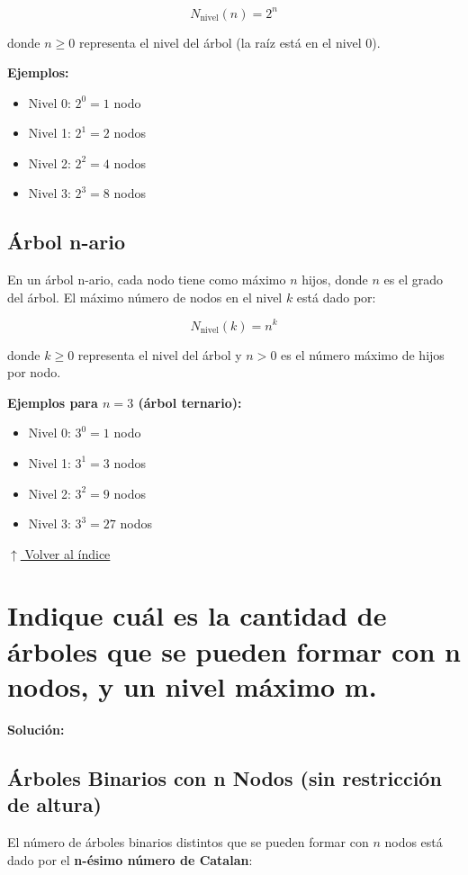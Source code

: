 \documentclass[12pt]{article}
\newcommand{\solucion}{%
    \vspace{0.8em}%
    \textbf{Solución:}%
}
\newcommand{\volverindice}{%
    \vspace{1em}%
    \begin{flushright}%
        \hyperlink{indice}{\small $\uparrow$ Volver al índice}%
    \end{flushright}%
}
\begin{document}
\[
N_{\text{nivel}}(n) = 2^n
\]

donde $n \geq 0$ representa el nivel del árbol (la raíz está en el nivel 0).

\textbf{Ejemplos:}
\begin{itemize}[leftmargin=2em]
    \item Nivel 0: $2^0 = 1$ nodo
    \item Nivel 1: $2^1 = 2$ nodos
    \item Nivel 2: $2^2 = 4$ nodos
    \item Nivel 3: $2^3 = 8$ nodos
\end{itemize}

\subsection*{Árbol n-ario}

En un árbol n-ario, cada nodo tiene como máximo $n$ hijos, donde $n$ es el grado del árbol. El máximo número de nodos en el nivel $k$ está dado por:

\[
N_{\text{nivel}}(k) = n^k
\]

donde $k \geq 0$ representa el nivel del árbol y $n > 0$ es el número máximo de hijos por nodo.

\textbf{Ejemplos para $n=3$ (árbol ternario):}
\begin{itemize}[leftmargin=2em]
    \item Nivel 0: $3^0 = 1$ nodo
    \item Nivel 1: $3^1 = 3$ nodos
    \item Nivel 2: $3^2 = 9$ nodos
    \item Nivel 3: $3^3 = 27$ nodos
\end{itemize}

\volverindice

\newpage
\section{Indique cuál es la cantidad de árboles que se pueden formar con n nodos, y un nivel máximo m.}

\solucion

\subsection*{Árboles Binarios con n Nodos (sin restricción de altura)}

El número de árboles binarios distintos que se pueden formar con $n$ nodos está dado por el \textbf{n-ésimo número de Catalan}:
\end{document}
